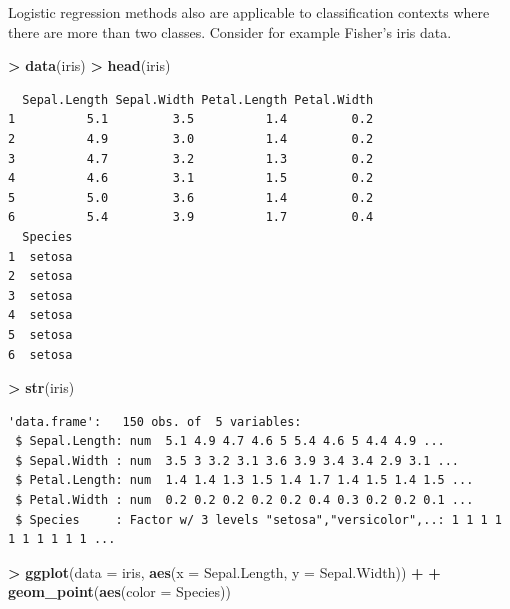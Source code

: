 \documentclass[]{krantz}
\makeatletter
\newenvironment{Shaded}{\begin{snugshade}}{\end{snugshade}}
\newcommand{\KeywordTok}[1]{\textcolor[rgb]{0.27,0.27,0.27}{\textbf{#1}}}
\newcommand{\DataTypeTok}[1]{\textcolor[rgb]{0.27,0.27,0.27}{#1}}
\newcommand{\StringTok}[1]{\textcolor[rgb]{0.5,0.5,0.5}{#1}}
\newcommand{\OperatorTok}[1]{\textcolor[rgb]{0.43,0.43,0.43}{\textbf{#1}}}
\newcommand{\NormalTok}[1]{#1}
\newenvironment{kframe}{%
\medskip{}
\setlength{\fboxsep}{.8em}
 \def\at@end@of@kframe{}%
 \ifinner\ifhmode%
  \def\at@end@of@kframe{\end{minipage}}%
  \begin{minipage}{\columnwidth}%
 \fi\fi%
 \def\FrameCommand##1{\hskip\@totalleftmargin \hskip-\fboxsep
 \colorbox{shadecolor}{##1}\hskip-\fboxsep
     \hskip-\linewidth \hskip-\@totalleftmargin \hskip\columnwidth}%
 \MakeFramed {\advance\hsize-\width
   \@totalleftmargin\z@ \linewidth\hsize
   \@setminipage}}%
 {\par\unskip\endMakeFramed%
 \at@end@of@kframe}
\renewenvironment{Shaded}{\begin{kframe}}{\end{kframe}}
\makeatother
\begin{document}
Logistic regression methods also are applicable to classification
contexts where there are more than two classes. Consider for example
Fisher's iris data.

\begin{Shaded}
\begin{Highlighting}[]
\OperatorTok{>}\StringTok{ }\KeywordTok{data}\NormalTok{(iris)}
\OperatorTok{>}\StringTok{ }\KeywordTok{head}\NormalTok{(iris)}
\end{Highlighting}
\end{Shaded}

\begin{verbatim}
  Sepal.Length Sepal.Width Petal.Length Petal.Width
1          5.1         3.5          1.4         0.2
2          4.9         3.0          1.4         0.2
3          4.7         3.2          1.3         0.2
4          4.6         3.1          1.5         0.2
5          5.0         3.6          1.4         0.2
6          5.4         3.9          1.7         0.4
  Species
1  setosa
2  setosa
3  setosa
4  setosa
5  setosa
6  setosa
\end{verbatim}

\begin{Shaded}
\begin{Highlighting}[]
\OperatorTok{>}\StringTok{ }\KeywordTok{str}\NormalTok{(iris)}
\end{Highlighting}
\end{Shaded}

\begin{verbatim}
'data.frame':   150 obs. of  5 variables:
 $ Sepal.Length: num  5.1 4.9 4.7 4.6 5 5.4 4.6 5 4.4 4.9 ...
 $ Sepal.Width : num  3.5 3 3.2 3.1 3.6 3.9 3.4 3.4 2.9 3.1 ...
 $ Petal.Length: num  1.4 1.4 1.3 1.5 1.4 1.7 1.4 1.5 1.4 1.5 ...
 $ Petal.Width : num  0.2 0.2 0.2 0.2 0.2 0.4 0.3 0.2 0.2 0.1 ...
 $ Species     : Factor w/ 3 levels "setosa","versicolor",..: 1 1 1 1 1 1 1 1 1 1 ...
\end{verbatim}

\begin{Shaded}
\begin{Highlighting}[]
\OperatorTok{>}\StringTok{ }\KeywordTok{ggplot}\NormalTok{(}\DataTypeTok{data =}\NormalTok{ iris, }\KeywordTok{aes}\NormalTok{(}\DataTypeTok{x =}\NormalTok{ Sepal.Length, }\DataTypeTok{y =}\NormalTok{ Sepal.Width)) }\OperatorTok{+}\StringTok{ }
\OperatorTok{+}\StringTok{   }\KeywordTok{geom_point}\NormalTok{(}\KeywordTok{aes}\NormalTok{(}\DataTypeTok{color =}\NormalTok{ Species))}
\end{Highlighting}
\end{Shaded}
\end{document}

